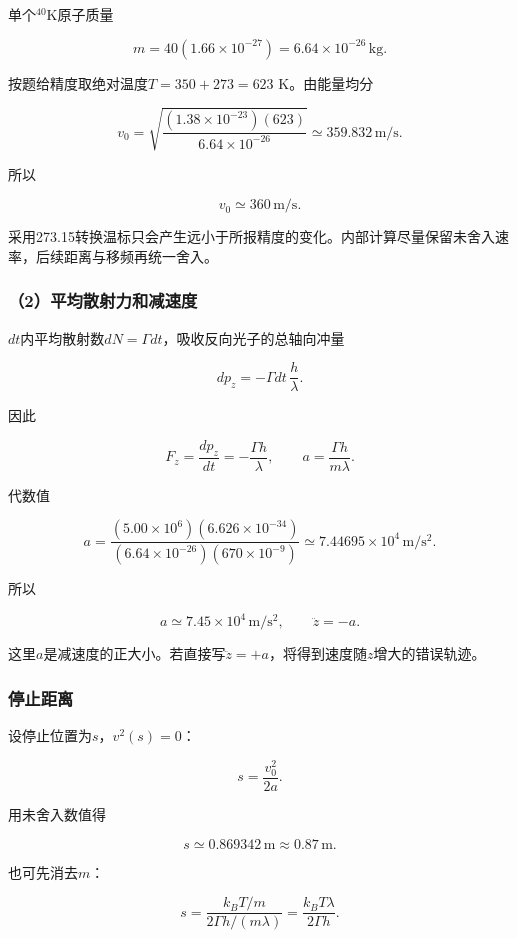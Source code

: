 \documentclass[12pt,a4paper,fontset=fandol]{ctexart}
\begin{document}
单个\(^{40}\mathrm K\)原子质量

\[
m=40(1.66\times10^{-27})
=6.64\times10^{-26}\,\mathrm{kg}.
\]

按题给精度取绝对温度\(T=350+273=623\) K。由能量均分

\[
v_0=\sqrt{\frac{(1.38\times10^{-23})(623)}
{6.64\times10^{-26}}}
\simeq359.832\,\mathrm{m/s}.
\]

所以

\[
\boxed{v_0\simeq360\,\mathrm{m/s}}.
\]

采用273.15转换温标只会产生远小于所报精度的变化。内部计算尽量保留未舍入速率，后续距离与移频再统一舍入。

\subsubsection{（2）平均散射力和减速度}\label{ux5e73ux5747ux6563ux5c04ux529bux548cux51cfux901fux5ea6}

\(dt\)内平均散射数\(dN=\Gamma dt\)，吸收反向光子的总轴向冲量

\[
dp_z=-\Gamma dt\,\frac h\lambda.
\]

因此

\[
F_z=\frac{dp_z}{dt}=-\frac{\Gamma h}{\lambda},
\qquad
\boxed{a=\frac{\Gamma h}{m\lambda}}.
\]

代数值

\[
a=\frac{(5.00\times10^6)(6.626\times10^{-34})}
{(6.64\times10^{-26})(670\times10^{-9})}
\simeq7.44695\times10^4\,\mathrm{m/s^2}.
\]

所以

\[
\boxed{a\simeq7.45\times10^4\,\mathrm{m/s^2}},
\qquad \ddot z=-a.
\]

这里\(a\)是减速度的正大小。若直接写\(\ddot z=+a\)，将得到速度随\(z\)增大的错误轨迹。

\subsubsection{停止距离}\label{ux505cux6b62ux8dddux79bb}

设停止位置为\(s\)，\(v^2(s)=0\)：

\[
\boxed{s=\frac{v_0^2}{2a}}.
\]

用未舍入数值得

\[
s\simeq0.869342\,\mathrm m\approx0.87\,\mathrm m.
\]

也可先消去\(m\)：

\[
s=\frac{k_BT/m}{2\Gamma h/(m\lambda)}
=\frac{k_BT\lambda}{2\Gamma h}.
\]
\end{document}
